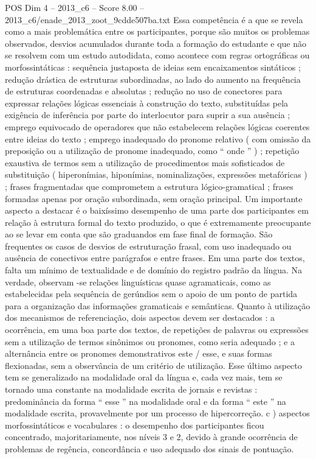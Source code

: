\begin{textsample}{POS Dim 4 – 2013\_c6 – Score 8.00 – 2013\_c6/enade\_2013\_zoot\_9cdde507ba.txt}
Essa competência é a que se revela como a mais problemática entre os participantes, porque são muitos os problemas observados, desvios acumulados durante toda a formação do estudante e que não se resolvem com um estudo autodidata, como acontece com regras ortográficas ou morfossintáticas : sequência justaposta de ideias sem encaixamentos sintáticos ; redução drástica de estruturas subordinadas, ao lado do aumento na frequência de estruturas coordenadas e absolutas ; redução no uso de conectores para expressar relações lógicas essenciais à construção do texto, substituídas pela exigência de inferência por parte do interlocutor para suprir a sua ausência ; emprego equivocado de operadores que não estabelecem relações lógicas coerentes entre ideias do texto ; emprego inadequado do pronome relativo ( com omissão da preposição ou a utilização de pronome inadequado, como “ onde ” ) ; repetição exaustiva de termos sem a utilização de procedimentos mais sofisticados de substituição ( hiperonímias, hiponímias, nominalizações, expressões metafóricas ) ; frases fragmentadas que comprometem a estrutura lógico-gramatical ; frases formadas apenas por oração subordinada, sem oração principal.
Um importante aspecto a destacar é o baixíssimo desempenho de uma parte dos participantes em relação à estrutura formal do texto produzido, o que é extremamente preocupante ao se levar em conta que são graduandos em fase final de formação.
São frequentes os casos de desvios de estruturação frasal, com uso inadequado ou ausência de conectivos entre parágrafos e entre frases.
Em uma parte dos textos, falta um mínimo de textualidade e de domínio do registro padrão da língua.
Na verdade, observam -se relações linguísticas quase agramaticais, como as estabelecidas pela sequência de gerúndios sem o apoio de um ponto de partida para a organização das informações gramaticais e semânticas.
Quanto à utilização dos mecanismos de referenciação, dois aspectos devem ser destacados : a ocorrência, em uma boa parte dos textos, de repetições de palavras ou expressões sem a utilização de termos sinônimos ou pronomes, como seria adequado ; e a alternância entre os pronomes demonstrativos este / esse, e suas formas flexionadas, sem a observância de um critério de utilização.
Esse último aspecto tem se generalizado na modalidade oral da língua e, cada vez mais, tem se tornado uma constante na modalidade escrita de jornais e revistas : predominância da forma “ esse ” na modalidade oral e da forma “ este ” na modalidade escrita, provavelmente por um processo de hipercorreção. c ) aspectos morfossintáticos e vocabulares : o desempenho dos participantes ficou concentrado, majoritariamente, nos níveis 3 e 2, devido à grande ocorrência de problemas de regência, concordância e uso adequado dos sinais de pontuação.

\end{textsample}

